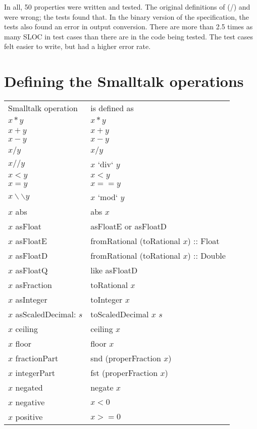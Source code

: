 \documentclass[prodmode,acmtoplas]{acmsmall}
\begin{document}
In all, 50 properties were written and tested.  The original definitions
of (/) and  were wrong; the tests found that.  In the binary
version of the specification, the tests also found an error in output
conversion.  There are more than 2.5 times as many
SLOC in test cases than there are in the code being tested.
The test cases felt easier to write, but had a higher error rate.

\section{Defining the Smalltalk operations}
\begin{tabular}{ll}
Smalltalk operation   & is defined as\\
$x \ast y$            & $x \ast y$ \\
$x + y$               & $x + y$ \\
$x - y$               & $x - y$ \\
$x / y$               & $x / y$ \\
$x // y$              & $x$ `div` $y$\\
$x < y$               & $x < y$ \\
$x = y$               & $x == y$ \\
$x \backslash\backslash y$ & $x$ `mod` $y$\\
$x$ abs               & abs $x$\\
$x$ asFloat           & asFloatE or asFloatD\\
$x$ asFloatE          & fromRational (toRational $x$) :: Float\\
$x$ asFloatD          & fromRational (toRational $x$) :: Double\\
$x$ asFloatQ          & like asFloatD\\
$x$ asFraction        & toRational $x$\\
$x$ asInteger         & toInteger $x$\\
$x$ asScaledDecimal: $s$ & toScaledDecimal $x$ $s$\\
$x$ ceiling           & ceiling $x$\\
$x$ floor             & floor $x$\\
$x$ fractionPart      & snd (properFraction $x$)\\
$x$ integerPart       & fst (properFraction $x$)\\
$x$ negated           & negate $x$\\
$x$ negative          & $x < 0$\\
$x$ positive          & $x >= 0$\\

\end{tabular}
\end{document}
